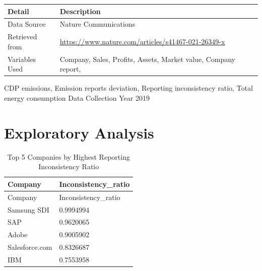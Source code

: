 \documentclass[
  12pt,
]{article}
\begin{document}
\begin{longtable}[]{@{}ll@{}}
\toprule
\begin{minipage}[b]{0.58\columnwidth}\raggedright
\textbf{Detail}\strut
\end{minipage} & \begin{minipage}[b]{0.36\columnwidth}\raggedright
\textbf{Description}\strut
\end{minipage}\tabularnewline
\midrule
\endhead
\begin{minipage}[t]{0.58\columnwidth}\raggedright
Data Source\strut
\end{minipage} & \begin{minipage}[t]{0.36\columnwidth}\raggedright
Nature Communications\strut
\end{minipage}\tabularnewline
\begin{minipage}[t]{0.58\columnwidth}\raggedright
Retrieved from\strut
\end{minipage} & \begin{minipage}[t]{0.36\columnwidth}\raggedright
\url{https://www.nature.com/articles/s41467-021-26349-x}\strut
\end{minipage}\tabularnewline
\begin{minipage}[t]{0.58\columnwidth}\raggedright
Variables Used\strut
\end{minipage} & \begin{minipage}[t]{0.36\columnwidth}\raggedright
Company, Sales, Profits, Assets, Market value, Company report,\strut
\end{minipage}\tabularnewline
\bottomrule
\end{longtable}

CDP emissions, Emission reports deviation, Reporting inconsistency
ratio, Total energy consumption Data Collection Year \textbar{} 2019
\newpage

\hypertarget{exploratory-analysis}{%
\section{Exploratory Analysis}\label{exploratory-analysis}}

\begin{longtable}[]{@{}ll@{}}
\caption{Top 5 Companies by Highest Reporting Inconsistency
Ratio}\tabularnewline
\toprule
Company & Inconsistency\_ratio\tabularnewline
\midrule
\endfirsthead
\toprule
Company & Inconsistency\_ratio\tabularnewline
\midrule
\endhead
Samsung SDI & 0.9994994\tabularnewline
SAP & 0.9620065\tabularnewline
Adobe & 0.9005902\tabularnewline
Salesforce.com & 0.8326687\tabularnewline
IBM & 0.7553958\tabularnewline
\bottomrule
\end{longtable}
\end{document}
